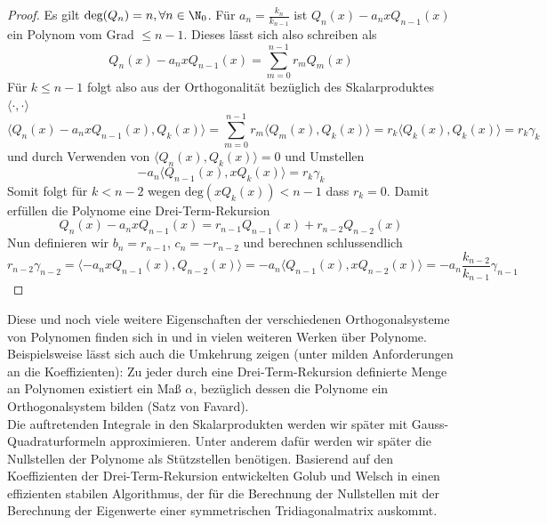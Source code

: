 \begin{proof}
Es gilt $\text{deg}(Q_n)=n,\forall n\in\N_0$. Für $a_n=\frac{k_n}{k_{n-1}}$ ist $Q_n(x)-a_nxQ_{n-1}(x)$ ein Polynom vom Grad $\le n-1$. Dieses lässt sich also schreiben als
\[Q_n(x)-a_nxQ_{n-1}(x)=\sum_{m=0}^{n-1}r_mQ_m(x)\]
Für $k\le n-1$ folgt also aus der Orthogonalität bezüglich des Skalarproduktes $\langle\cdot,\cdot\rangle$
\begin{equation*}
\langle Q_n(x)-a_nxQ_{n-1}(x),Q_k(x)\rangle=\sum_{m=0}^{n-1}r_m\langle Q_m(x),Q_k(x)\rangle=r_k\langle Q_k(x),Q_k(x)\rangle=r_k\gamma_k
\end{equation*}
und durch Verwenden von $\langle Q_n(x),Q_k(x)\rangle = 0$ und Umstellen
\[ -a_n\langle Q_{n-1}(x),xQ_k(x)\rangle=r_k\gamma_k\]
Somit folgt für $k<n-2$ wegen $\text{deg}(xQ_k(x))<n-1$ dass $r_k=0$. Damit erfüllen die Polynome eine Drei-Term-Rekursion
\[Q_n(x)-a_nxQ_{n-1}(x)=r_{n-1}Q_{n-1}(x)+r_{n-2}Q_{n-2}(x)\]
Nun definieren wir $b_n=r_{n-1}$, $c_n=-r_{n-2}$ und berechnen schlussendlich
\[r_{n-2}\gamma_{n-2}=\langle -a_nxQ_{n-1}(x),Q_{n-2}(x)\rangle =-a_n\langle Q_{n-1}(x),xQ_{n-2}(x)\rangle=-a_n\frac{k_{n-2}}{k_{n-1}}\gamma_{n-1}\]
\end{proof}
Diese und noch viele weitere Eigenschaften der verschiedenen Orthogonalsysteme von Polynomen finden sich in \autocite{weborthopoly} und in vielen weiteren Werken über Polynome. Beispielsweise lässt sich auch die Umkehrung zeigen (unter milden Anforderungen an die Koeffizienten): Zu jeder durch eine Drei-Term-Rekursion definierte Menge an Polynomen existiert ein Maß $\alpha$, bezüglich dessen die Polynome ein Orthogonalsystem bilden (Satz von Favard).\\[0.3cm]
Die auftretenden Integrale in den Skalarprodukten werden wir später mit Gauss-Quadraturformeln approximieren. Unter anderem dafür werden wir später die Nullstellen der Polynome als Stützstellen benötigen. Basierend auf den Koeffizienten der Drei-Term-Rekursion entwickelten Golub und Welsch in \autocite{GolubWelsch} einen effizienten stabilen Algorithmus, der für die Berechnung der Nullstellen mit der Berechnung der Eigenwerte einer symmetrischen Tridiagonalmatrix auskommt.

